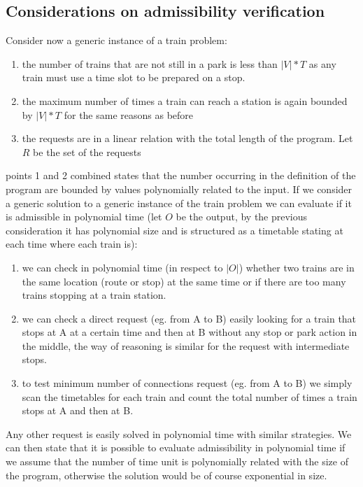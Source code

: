 \documentclass[11pt]{article}
\begin{document}
\subsection{Considerations on admissibility verification }
Consider now a generic instance of a train problem:
\begin{enumerate}
\item the number of trains that are not still in a park is less than $|V|*T$ as any train must use a time slot to be prepared on a stop.
\item the maximum number of times a train can reach a station is again bounded by $|V|*T$ for the same reasons as before
\item the requests are in a linear relation with the total length of the program. Let $R$ be the set of the requests  
\end{enumerate}
points 1 and 2 combined states that the number occurring in the definition of the program are bounded by values polynomially related to the input. 
If we consider a generic solution to a generic instance of the train problem we can evaluate if it is admissible in
polynomial time (let $O$ be the output, by the previous consideration it has polynomial size and is structured as a timetable stating at each time where each train is):
\begin{enumerate}
\item we can check in polynomial time (in respect to $|O|$) whether two trains are in the same location (route or stop) at the same time or if there are too many trains stopping at a train station. 
\item we can check a direct request (eg. from A to B) easily looking for a train that stops at A at a certain time and then at B without any stop or park action in the middle, the way of reasoning is similar for the request with intermediate stops.
\item to test minimum number of connections request (eg. from A to B) we simply scan the timetables for each train and count the total number of times a train stops at A and then at B. 
\end{enumerate}
Any other request is easily solved in polynomial time with similar strategies. We can then state that it is possible to evaluate admissibility in polynomial time if we assume that
the number of time unit is polynomially related with the size of the program, 
otherwise the solution would be of course exponential in size.
\end{document}
